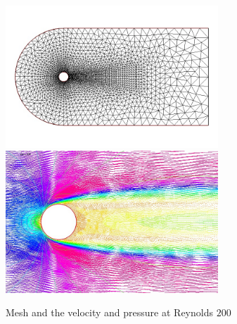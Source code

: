 \documentclass[a4paper,twoside,12pt]{book}
\begin{document}
\begin{figure}[htbp]
\begin{center}
\includegraphics[width=8cm]{NSNewtonTh}
\includegraphics[width=8cm]{NSNewtonUP}
\caption{\label{NSNewton} Mesh and the velocity and pressure at Reynolds  $ 200$ }
\end{center}
\end{figure}


%
%
%
%
%
%
\end{document}
